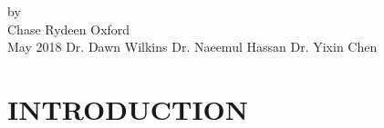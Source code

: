 \documentclass[reqno,12pt,oneside,letter]{report} %
\begin{document}
\setlength{\parindent}{0.5in}

{by \\
Chase Rydeen}
{Oxford \\
May 2018}	%
{Dr. Dawn Wilkins} %
{Dr. Naeemul Hassan} %
{Dr. Yixin Chen} %

\initializefrontsections



\makeatletter
\if@twoside \setcounter{page}{4} \else \setcounter{page}{1} \fi
\makeatother

\startabstractpage

\label{Abstract}

\startdedicationspage

\label{Dedication}

\startacknowledgementspage

\label{Acknowledgements}

%

\tableofcontents     %
\listoffigures       %

\startthechapters

 \chapter{INTRODUCTION}
 \label{chap:Introduction}
 
\end{document}
